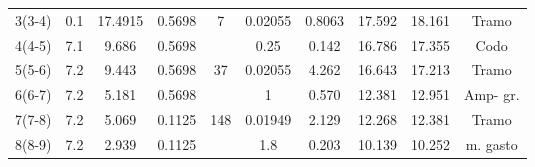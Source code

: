 \begin{table}[h!]
\begin{tabular}{@{}cccccccccc@{}}
    3(3-4)                                               & 0.1      & 17.4915                                                               & 0.5698                                                              & 7                                                    & 0.02055       & 0.8063                                                   & 17.592    & 18.161                                                  & Tramo     \\
    4(4-5)                                               & 7.1      & 9.686                                                                 & 0.5698                                                              &                                                      & 0.25          & 0.142                                                    & 16.786    & 17.355                                                  & Codo      \\
    5(5-6)                                               & 7.2      & 9.443                                                                 & 0.5698                                                              & 37                                                   & 0.02055       & 4.262                                                    & 16.643    & 17.213                                                  & Tramo     \\
    6(6-7)                                               & 7.2      & 5.181                                                                 & 0.5698                                                              &                                                      & 1             & 0.570                                                    & 12.381    & 12.951                                                  & Amp- gr.  \\
    7(7-8)                                               & 7.2      & 5.069                                                                 & 0.1125                                                              & 148                                                  & 0.01949       & 2.129                                                    & 12.268    & 12.381                                                  & Tramo     \\
    8(8-9)                                               & 7.2      & 2.939                                                                 & 0.1125                                                              &                                                      & 1.8           & 0.203                                                    & 10.139    & 10.252                                                  & m. gasto  \\

\end{tabular}
\end{table}
